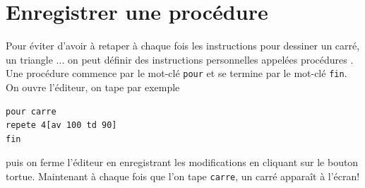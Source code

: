 \section{Enregistrer une procédure}
\noindent Pour éviter d'avoir à retaper à chaque fois les instructions pour
dessiner un carré, un triangle ... on peut définir des instructions personnelles appelées \og procédures \fg. Une procédure commence par le mot-clé \texttt{pour} et se termine par le mot-clé \texttt{fin}. On ouvre l'éditeur, on tape par exemple

\begin{verbatim}
pour carre
repete 4[av 100 td 90]
fin
\end{verbatim}
puis on ferme l'éditeur en enregistrant les modifications en cliquant sur le bouton tortue.  Maintenant à chaque fois que l'on tape \texttt{carre}, un carré apparaît à l'écran!

